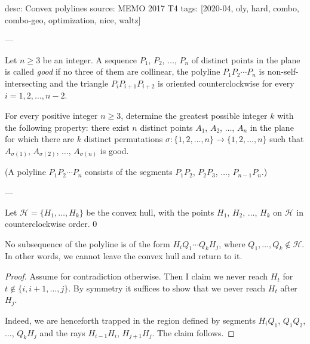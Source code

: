desc: Convex polylines
source: MEMO 2017 T4
tags: [2020-04, oly, hard, combo, combo-geo, optimization, nice, waltz]

---

Let $n\ge3$ be an integer. A sequence $P_1$, $P_2$, $\ldots$, $P_n$ of distinct points in the plane is called \emph{good} if no three of them are collinear, the polyline $P_1P_2\cdots P_n$ is non-self-intersecting and the triangle $P_iP_{i+1}P_{i+2}$ is oriented counterclockwise for every $i=1,2,\ldots,n-2$.

For every positive integer $n\ge3$, determine the greatest possible integer $k$ with the following property: there exist $n$ distinct points $A_1$, $A_2$, $\ldots$, $A_n$ in the plane for which there are $k$ distinct permutations $\sigma:\{1,2,\ldots,n\}\to\{1,2,\ldots,n\}$ such that $A_{\sigma(1)}$, $A_{\sigma(2)}$, $\ldots$, $A_{\sigma(n)}$ is good.

(A polyline $P_1P_2\cdots P_n$ consists of the segments $P_1P_2$, $P_2P_3$, $\ldots$, $P_{n-1}P_n$.)

---

Let $\mathcal H=\{H_1,\ldots,H_k\}$ be the convex hull, with the points $H_1$, $H_2$, $\ldots$, $H_k$ on $\mathcal H$ in counterclockwise order.
\setcounter{claim}0
\begin{claim}
    No subsequence of the polyline is of the form $H_iQ_1\cdots Q_kH_j$, where $Q_1,\ldots,Q_k\notin\mathcal H$. In other words, we cannot leave the convex hull and return to it.
\end{claim}
\begin{proof}
    Assume for contradiction otherwise. Then I claim we never reach $H_t$ for $t\notin\{i,i+1,\ldots,j\}$. By symmetry it suffices to show that we never reach $H_t$ after $H_j$.

    Indeed, we are henceforth trapped in the region defined by segments $H_iQ_1$, $Q_1Q_2$, $\ldots$, $Q_kH_j$ and the rays $H_{i-1}H_i$, $H_{j+1}H_j$. The claim follows.
\end{proof}

